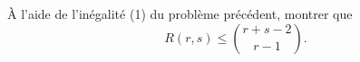 À l'aide de l'inégalité (1) du problème précédent, montrer que
\[ R(r, s) \leq \binom{r + s - 2}{r - 1}. \]
